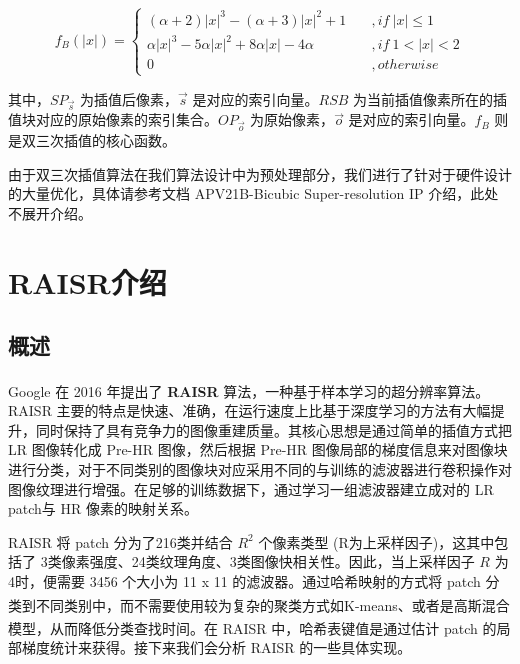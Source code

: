 \documentclass[12pt, a4paper, oneside]{ctexbook}
\begin{document}
	\begin{equation}
		f_B(|x|)=
		\begin{cases}
	(\alpha + 2)|x|^3-(\alpha+3)|x|^2+1\quad &,if\ |x| \leq1\\
	\alpha|x|^3-5\alpha|x|^2+8\alpha|x|-4\alpha\quad&,if \ 1<|x|<2\\
	0&,otherwise				
	\label{bicubic_2}
		\end{cases}
	\end{equation}
	\par
	其中，$SP_{\vec{s}}$ 为插值后像素，$\vec{s}$ 是对应的索引向量。$RSB$ 为当前插值像素所在的插值块对应的原始像素的索引集合。$OP_{\vec{o}}$ 为原始像素，$\vec{o}$ 是对应的索引向量。$f_B$ 则是双三次插值的核心函数。\par 由于双三次插值算法在我们算法设计中为预处理部分，我们进行了针对于硬件设计的大量优化，具体请参考文档 APV21B-Bicubic Super-resolution IP 介绍，此处不展开介绍。

	\section{RAISR介绍}
	\subsection{概述}
	Google 在 2016 年提出了 \textbf{RAISR}\textsuperscript{\cite{1}} 算法，一种基于样本学习的超分辨率算法。RAISR 主要的特点是快速、准确，在运行速度上比基于深度学习的方法有大幅提升，同时保持了具有竞争力的图像重建质量。其核心思想是通过简单的插值方式把 LR 图像转化成 Pre-HR 图像，然后根据 Pre-HR 图像局部的梯度信息来对图像块进行分类，对于不同类别的图像块对应采用不同的与训练的滤波器进行卷积操作对图像纹理进行增强。在足够的训练数据下，通过学习一组滤波器建立成对的 LR patch与 HR 像素的映射关系。\par RAISR 将 patch 分为了216类并结合 $R^2$ 个像素类型 (R为上采样因子)，这其中包括了 3类像素强度、24类纹理角度、3类图像快相关性。因此，当上采样因子 $R$ 为4时，便需要 3456 个大小为 11 x 11 的滤波器。通过哈希映射的方式将 patch 分类到不同类别中，而不需要使用较为复杂的聚类方式如K-means\textsuperscript{\cite{2}}、或者是高斯混合模型\textsuperscript{\cite{3}}，从而降低分类查找时间。在 RAISR 中，哈希表键值是通过估计 patch 的局部梯度统计来获得。接下来我们会分析 RAISR 的一些具体实现。
\end{document}
